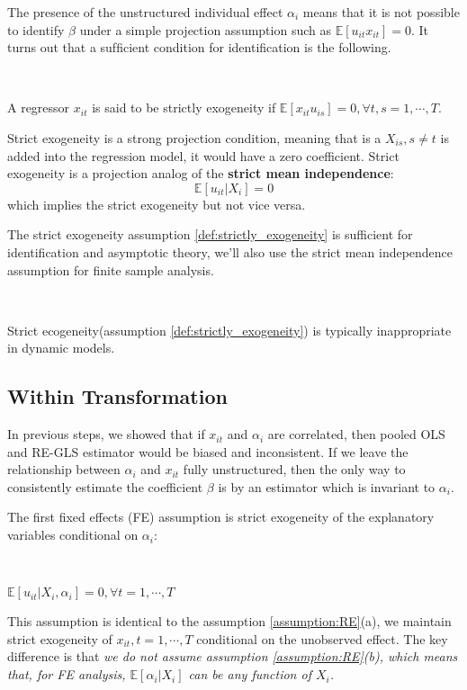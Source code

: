 The presence of the unstructured individual effect $\alpha_i$ means that it is not possible to identify $\beta$ under a simple projection assumption such as $\mathbb{E}[u_{it} x_{it}] = 0$.
It turns out that a sufﬁcient condition for identiﬁcation is the following.

\begin{definition}\label{def:strictly_exogeneity}
    \

    A regressor $x_{it}$ is said to be strictly exogeneity if $\mathbb{E}[x_{it} u_{is}] = 0, \forall t, s = 1, \cdots, T$.
\end{definition}
Strict exogeneity is a strong projection condition,  meaning that is a $X_{is}, s \neq t$ is added into the regression model,
it would have a zero coefficient. Strict exogeneity is a projection analog of the \textbf{strict mean independence}\label{FE:SMI}:
\[\mathbb{E}[u_{it} | X_i] = 0\] 
which implies the strict exogeneity but not vice versa.

The strict exogeneity assumption \ref{def:strictly_exogeneity} is sufficient for identification and
asymptotic theory, we'll also use the strict mean independence assumption for finite sample analysis.

\begin{remark}
    \

    Strict ecogeneity(assumption \ref{def:strictly_exogeneity}) is typically inappropriate in dynamic models.
\end{remark}

\subsection{Within Transformation}

In previous steps, we showed that if $x_{it}$ and $\alpha_i$ are correlated, then pooled OLS and RE-GLS estimator would be biased and inconsistent.
If we leave the relationship between $\alpha_i$ and $x_{it}$ fully unstructured,
then the only way to consistently estimate the coefficient $\beta$ is by an estimator
which is invariant to $\alpha_i$.

The first fixed effects (FE) assumption is strict exogeneity of the explanatory variables conditional on $\alpha_i$:
\begin{assumption}\label{assumption:FE-strictexogeneity}
    \

    $\mathbb{E}[u_{it} | X_i, \alpha_i] = 0, \forall t=1,\cdots, T$
\end{assumption}
This assumption is identical to the assumption \ref{assumption:RE}(a), we maintain strict exogeneity of $x_{it}, t=1, \cdots, T$
conditional on the unobserved effect.
The key difference is that \emph{we do not assume assumption \ref{assumption:RE}(b), which means that,
for FE analysis, $\mathbb{E}[\alpha_i | X_i]$ can be any function of $X_i$.}

